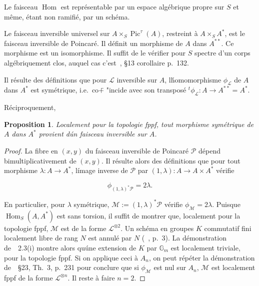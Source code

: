 \documentclass[11pt,a4paper]{article}
\theoremstyle{plain}
\newtheorem{proposition}[theorem]{Proposition}
\theoremstyle{definition}
\DeclareMathOperator{\Hom}{Hom}
\DeclareMathOperator{\Pic}{Pic}
\begin{document}
Le faisceau $\Hom$ est repr\'esentable par un espace alg\'ebrique propre sur $S$ et
m\^eme, \'etant non ramifi\'e, par un sch\'ema.

Le faisceau inversible universel sur $A \times_S \Pic^\tau(A)$, restreint \`a $A \times_S A^*$, est le
faisceau inversible de Poincar\'e. Il d\'efinit un morphisme de $A$ dans $A^{**}$. Ce
morphisme est un isomorphisme. Il suffit de le v\'erifier pour $S$ spectre d'un
corps alg\'ebriquement clos, auquel cas c'est~\cite{AV}, \S13 corollaire p.~132.


Il r\'esulte des d\'efinitions que pour $\mathscr{L}$ inversible sur $A$, l\'homomorphisme $\phi_{\mathscr{L}}$
de $A$ dans $A^*$ est sym\'etrique, i.e.~co\"  + "{i}ncide avec son transpos\'e ${}^t\phi_{\mathscr{L}}: A \to A^{**} = A^*$.

R\'eciproquement,

\begin{proposition}
Localement pour la topologie fppf, tout morphisme sym\'etrique de $A$ dans $A^*$ provient d\'un faisceau inversible sur $A$.
\end{proposition}

\begin{proof}
La fibre en $(x,y)$ du faisceau inversible de Poincar\'e $\mathscr{P}$ d\'epend
bimultiplicativement de $(x,y)$. Il r\'esulte alors des d\'efinitions que pour tout
morphisme $\lambda: A \to A^*$, l\'image inverse de $\mathscr{P}$ par $(1, \lambda): A \to A \times A^*$ v\'erifie

\begin{equation}
\phi_{(1,\lambda)^*\mathscr{P}} = 2\lambda.
\end{equation}

En particulier, pour $\lambda$ sym\'etrique, $\mathscr{M} := (1, \lambda)^*\mathscr{P}$ v\'erifie $\phi_{\mathscr{M}} = 2\lambda$. Puisque
$\Hom_S(A, A^*)$ est sans torsion, il suffit de montrer que, localement pour la
topologie fppf, $\mathscr{M}$ est de la forme $\mathscr{L}^{\otimes 2}$. Un sch\'ema en groupes $K$ commutatif
fini localement libre de rang $N$ est annul\'e par $N$ (~\cite{OortTate}, p.~3). La d\'emonstration
de~\cite{Breen}~2.3(i) montre alors qu\'une extension de $K$ par $\mathbb{G}_m$ est localement triviale,
pour la topologie fppf. Si on applique ceci \`a $A_n$, on peut r\'ep\'eter la d\'emonstration
de~\cite{AV}~\S23, Th.~3, p.~231 pour conclure que si $\phi_{\mathscr{M}}$ est nul sur $A_n$, $\mathscr{M}$ est
localement fppf de la forme $\mathscr{L}^{\otimes n}$. Il reste \`a faire $n=2$.
\end{proof}
\end{document}
